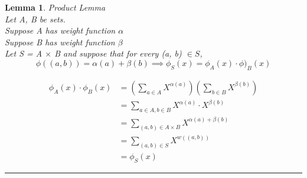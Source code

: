 \documentclass{article}
\newtheorem{lemma}[theorem]{Lemma}
\newenvironment{proof}{{\bf Proof:}}{\hfill\rule{2mm}{2mm}}
\begin{document}
\begin{lemma}
Product Lemma \\
Let A, B be sets.\\
Suppose A has weight function \(\alpha\) \\
Suppose B has weight function \(\beta\) \\
Let S = A \(\times\) B and suppose that for every (a, b) \(\in S\), 
\[\phi ((a,b)) = \alpha(a) + \beta(b) \implies \phi_S(x) = \phi_A(x) \cdot \phi)_B(x)\] 
\end{lemma}

\begin{proof}
\[ \begin{aligned} \phi_A(x) \cdot \phi_B(x)  & = \left( \sum_{a \in A} X^{\alpha(a)} \right) \left(\sum_{b \in B} X^{\beta(b)}\right) \\ 
& = \sum_{a \in A , b \in B} X^{\alpha(a)} \cdot X^{\beta(b)} \\ & = \sum_{(a, b) \in A \times B} X^{\alpha(a) + \beta(b)} \\& = \sum_{(a,b) \in S} X^{w((a, b))} \\ & = \phi_S (x) \end{aligned}\]
\end{proof}
\end{document}
